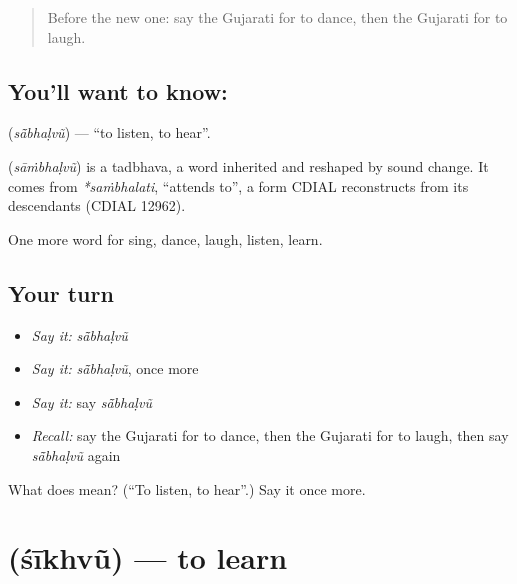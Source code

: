 \label{lesson:GU-C56-saambhalvu}



\begin{quote}
Before the new one: say the Gujarati for to dance, then the Gujarati for to laugh.
\end{quote}

\subsection*{You'll want to know: }
\textbf{} (\emph{sā̃bhaḷvũ}) — \textquotedblleft{}to listen, to hear\textquotedblright{}.

\begin{cousinweb}
\textbf{} (\emph{sāṁbhaḷvũ}) is a tadbhava, a word inherited and reshaped by sound change. It comes from \emph{*saṁbhalati}, \textquotedblleft{}attends to\textquotedblright{}, a form CDIAL reconstructs from its descendants (CDIAL 12962).
\end{cousinweb}

\begin{grammarlens}[title={What you've built}]
One more word for sing, dance, laugh, listen, learn.
\end{grammarlens}

\subsection*{Your turn}
\begin{itemize}
\raggedright
  \item \emph{Say it:} \emph{sā̃bhaḷvũ}
  \item \emph{Say it:} \emph{sā̃bhaḷvũ}, once more
  \item \emph{Say it:} say \emph{sā̃bhaḷvũ}
  \item \emph{Recall:} say the Gujarati for to dance, then the Gujarati for to laugh, then say \emph{sā̃bhaḷvũ} again
\end{itemize}

\begin{tcolorbox}[breakable,colback=teal!4,colframe=teal!35!black,title={Before you move on}]
What does  mean? (\textquotedblleft{}To listen, to hear\textquotedblright{}.) Say it once more.
\end{tcolorbox}
\section[\texorpdfstring{\gu{શીખવું} (śīkhvũ)}{શીખવું (śīkhvũ)}]{ (śīkhvũ) — to learn}

